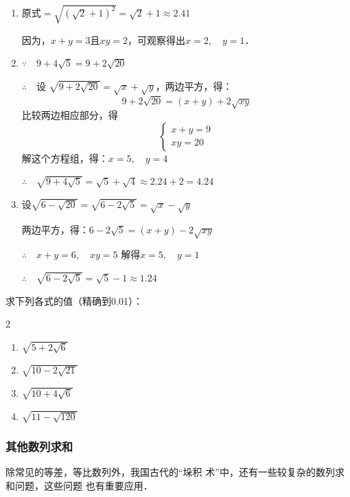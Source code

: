 \begin{solution}
\begin{enumerate}
    \item $\text{原式}=\sqrt{(\sqrt{2}+1)^2}=\sqrt{2}+1\approx 2.41$
    
因为，$x+y=3$且$xy=2$，可观察得出$x=2,\quad y=1$．
\item $\because\quad 9+4\sqrt{5}=9+2\sqrt{20}$

$\therefore\quad $设 $\sqrt{9+2\sqrt{20}}=\sqrt{x}+\sqrt{y}$，两边平方，得：
\[9+2\sqrt{20}=(x+y)+2\sqrt{xy}\]
比较两边相应部分，得
\[\begin{cases}
    x+y=9\\
xy=20
\end{cases}\]
解这个方程组，得：$x=5,\quad y=4$

$\therefore\quad \sqrt{9+4\sqrt{5}}=\sqrt{5}+\sqrt{4}\approx 2.24+2=4.24$

\item 设$\sqrt{6-\sqrt{20}}=\sqrt{6-2\sqrt{5}}=\sqrt{x}-\sqrt{y}$

两边平方，得：$6-2\sqrt{5}=(x+y)-2\sqrt{xy}$

$\therefore\quad x+y=6,\quad xy=5$
解得$x=5,\quad y=1$

$\therefore\quad \sqrt{6-2\sqrt{5}}=\sqrt{5}-1\approx 1.24$

\end{enumerate}
\end{solution}

\begin{ex}
    求下列各式的值（精确到0.01）：
\begin{multicols}{2}
    \begin{enumerate}
        \item $\sqrt{5+2\sqrt{6}}$
        \item $\sqrt{10-2\sqrt{21}}$
        \item $\sqrt{10+4\sqrt{6}}$
        \item $\sqrt{11-\sqrt{120}}$
    \end{enumerate}
\end{multicols}
\end{ex}






\subsubsection{其他数列求和}
除常见的等差，等比数列外，我国古代的“垛积
术”中，还有一些较复杂的数列求和问题，这些问题
也有重要应用．


